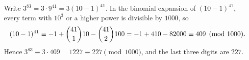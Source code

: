 Write $3^{83}=3\cdot9^{41}=3(10-1)^{41}$. In the binomial expansion of $(10-1)^{41}$, every term with $10^3$ or a higher power is divisible by $1000$, so
\[(10-1)^{41}\equiv-1+\dbinom{41}{1}10-\dbinom{41}{2}100=-1+410-82000\equiv409\pmod{1000}.\]
Hence $3^{83}\equiv3\cdot409=1227\equiv227\pmod{1000}$, and the last three digits are $\boxed{227}$.
